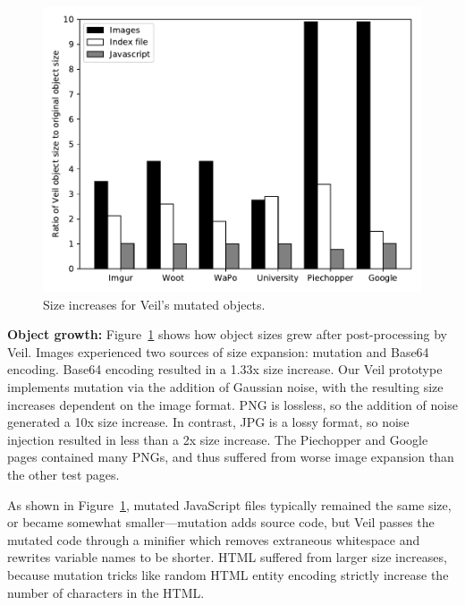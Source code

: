 \begin{figure}
	\centering
	\includegraphics[width=\textwidth]{veil-figs/size_graph.pdf}
	\caption{Size increases for Veil's mutated objects.}
	\label{fig:mutateSize}
\end{figure}

\noindent
\textbf{Object growth:}
Figure~\ref{fig:mutateSize} shows how object sizes grew
after post-processing by Veil. Images experienced
two sources of size expansion: mutation and Base64
encoding. Base64 encoding resulted in a 1.33x size
increase. Our Veil prototype implements mutation via
the addition of Gaussian noise, with the resulting
size increases dependent on the image format. PNG
is lossless, so the addition of noise generated
a 10x size increase. In contrast, JPG is a lossy
format, so noise injection resulted in less than
a 2x size increase. The Piechopper and Google pages
contained many PNGs, and thus suffered from worse
image expansion than the other test pages.

As shown in Figure~\ref{fig:mutateSize}, mutated
JavaScript files typically remained the same size,
or became somewhat smaller---mutation adds source
code, but Veil passes the mutated code through
a minifier which removes extraneous whitespace
and rewrites variable names to be shorter. HTML
suffered from larger size increases, because
mutation tricks like random HTML entity encoding
strictly increase the number of characters in the
HTML.

